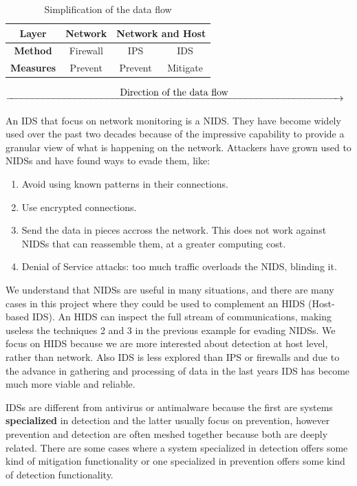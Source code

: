 \begin{table}[H]
	\centering
	\caption{Simplification of the data flow}
\linej
	\begin{tabular}{|c|c|c|c|}
	\hline
		\textbf{Layer} & \textbf{Network} & \multicolumn{2}{c|}{\textbf{Network and Host}}\\ \hline
		\textbf{Method} & Firewall & IPS & IDS\\ \hline
		\textbf{Measures} & Prevent & Prevent & Mitigate\\ \hline
	\end{tabular}
\end{table}
$\xrightarrow{\makebox[\textwidth]{Direction of the data flow}}$

\linej
\linej
An IDS that focus on network monitoring is a NIDS.
They have become widely used over the past two decades because of the impressive capability to provide a granular view of what is happening on the network.
\linej
Attackers have grown used to NIDSs and have found ways to evade them, like\cite{libro_ossec}:
\begin{enumerate}
	\item Avoid using known patterns in their connections.
	\item Use encrypted connections.
	\item Send the data in pieces accross the network. This does not work against NIDSs that can reassemble them, at a greater computing cost. %
	\item Denial of Service attacks: too much traffic overloads the NIDS, blinding it.
\end{enumerate}
\linej
We understand that NIDSs are useful in many situations, and there are many cases in this project where they could be used to complement an HIDS (Host-based IDS).
An HIDS can inspect the full stream of communications, making useless the techniques 2 and 3 in the previous example for evading NIDSs.
\linej
We focus on HIDS because we are more interested about detection at host level, rather than network.
Also IDS is less explored than IPS or firewalls and due to the advance in gathering and processing of data in the last years IDS has become much more viable and reliable.

\linej
\linej
IDSs are different from antivirus or antimalware because the first are systems \textbf{specialized} in detection and the latter usually focus on prevention, however prevention and detection are often meshed together because both are deeply related. There are some cases where a system specialized in detection offers some kind of mitigation functionality or one specialized in prevention offers some kind of detection functionality.

